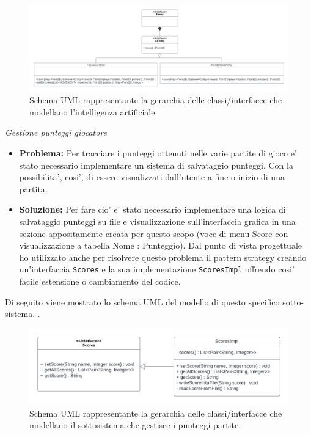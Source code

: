 \documentclass[a4paper,12pt]{report}
\begin{document}
\begin{figure}[H]
     \centering{}
     \includegraphics[width=\textwidth,height=\textheight,keepaspectratio]{img/AiEnemyUML.pdf}
     \caption{Schema UML rappresentante la gerarchia delle classi/interfacce che modellano l'intelligenza artificiale}
     \label{img:AiEnemyUML}
 \end{figure}
\textit{Gestione punteggi giocatore}
\begin{itemize}
    \item \textbf{Problema:} Per tracciare i punteggi ottenuti nelle varie partite di gioco e' stato necessario implementare un sistema di salvataggio punteggi. Con la possibilita', cosi', di essere visualizzati dall'utente a fine o inizio di una partita.
    \item \textbf{Soluzione:} Per fare cio' e' stato necessario implementare una logica di salvataggio punteggi su file e visualizzazione sull'interfaccia grafica in una sezione appositamente creata per questo scopo (voce di menu Score con visualizzazione a tabella Nome : Punteggio).
    Dal punto di vista progettuale ho utilizzato anche per risolvere questo problema il pattern strategy creando un'interfaccia \verb|Scores| e la sua implementazione \verb|ScoresImpl| offrendo cosi' facile estensione o cambiamento del codice.
\end{itemize}
Di seguito viene mostrato lo schema UML del modello di questo specifico sotto-sistema. .
\begin{figure}[H]
     \centering{}
     \includegraphics[width=\textwidth,height=\textheight,keepaspectratio]{img/ScoresUML.pdf}
     \caption{Schema UML rappresentante la gerarchia delle classi/interfacce che modellano il sottosistema che gestisce i punteggi partite.}
     \label{img:ScoresUML}
\end{figure}
\end{document}

